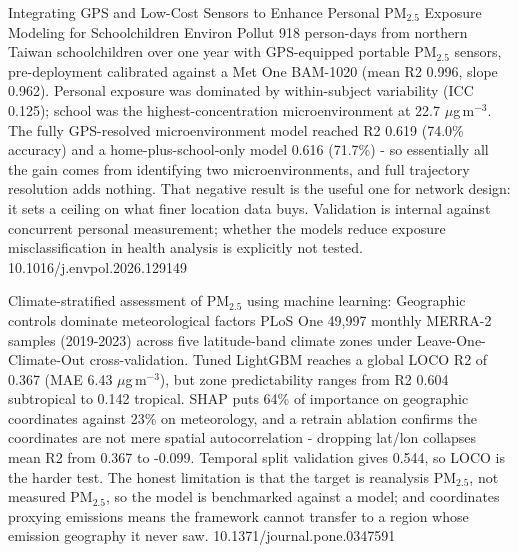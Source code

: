 \documentclass[10pt]{article}
\begin{document}
{Integrating GPS and Low-Cost Sensors to Enhance Personal PM$_{2.5}$ Exposure Modeling for Schoolchildren}
{Environ Pollut}
{918 person-days from northern Taiwan schoolchildren over one year with GPS-equipped portable PM$_{2.5}$ sensors, pre-deployment calibrated against a Met One BAM-1020 (mean R2 0.996, slope 0.962). Personal exposure was dominated by within-subject variability (ICC 0.125); school was the highest-concentration microenvironment at 22.7 $\mu$g\,m$^{-3}$. The fully GPS-resolved microenvironment model reached R2 0.619 (74.0\% accuracy) and a home-plus-school-only model 0.616 (71.7\%) - so essentially all the gain comes from identifying two microenvironments, and full trajectory resolution adds nothing. That negative result is the useful one for network design: it sets a ceiling on what finer location data buys. Validation is internal against concurrent personal measurement; whether the models reduce exposure misclassification in health analysis is explicitly not tested.}
{10.1016/j.envpol.2026.129149}


{Climate-stratified assessment of PM$_{2.5}$ using machine learning: Geographic controls dominate meteorological factors}
{PLoS One}
{49,997 monthly MERRA-2 samples (2019-2023) across five latitude-band climate zones under Leave-One-Climate-Out cross-validation. Tuned LightGBM reaches a global LOCO R2 of 0.367 (MAE 6.43 $\mu$g\,m$^{-3}$), but zone predictability ranges from R2 0.604 subtropical to 0.142 tropical. SHAP puts 64\% of importance on geographic coordinates against 23\% on meteorology, and a retrain ablation confirms the coordinates are not mere spatial autocorrelation - dropping lat/lon collapses mean R2 from 0.367 to -0.099. Temporal split validation gives 0.544, so LOCO is the harder test. The honest limitation is that the target is reanalysis PM$_{2.5}$, not measured PM$_{2.5}$, so the model is benchmarked against a model; and coordinates proxying emissions means the framework cannot transfer to a region whose emission geography it never saw.}
{10.1371/journal.pone.0347591}
\end{document}
